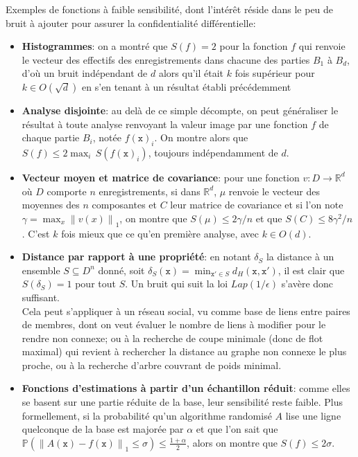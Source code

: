 \documentclass[a4paper,11pt]{article} %
\begin{document}
Exemples de fonctions à faible sensibilité, dont l'intérêt réside dans le peu de bruit à ajouter pour assurer la confidentialité différentielle:
\begin{itemize}
    \item 
    \textbf{Histogrammes}: on a montré que $S(f)=2$ pour la fonction $f$ qui renvoie le vecteur des effectifs des enregistrements dans chacune des parties $B_1$ à $B_d$, d'où un bruit indépendant de $d$ alors qu'il était $k$ fois supérieur pour $k\in O(\sqrt{d})$ en s'en tenant à un résultat établi précédemment~\cite{BDMK05} %
    \item 
    \textbf{Analyse disjointe}: au delà de ce simple décompte, on peut généraliser le résultat à toute analyse renvoyant la valeur image par une fonction $f$ de chaque partie $B_i$, notée $f(\mathtt{x})_i$. 
    On montre alors que $S(f)\leqslant2\max_i\,S\left(f(\mathtt{x})_i\right)$, toujours indépendamment de $d$.
    \item 
    \textbf{Vecteur moyen et matrice de covariance}: pour une fonction $v:D\longrightarrow\mathbb{R}^d$ où $D$ comporte $n$ enregistrements, si dans $\mathbb{R}^d$,  $\mu$ renvoie le vecteur des moyennes des $n$ composantes et $C$ leur matrice de covariance et si l'on note $\gamma=\max_x\left\|v(x)\right\|_1$, on montre que $S(\mu)\leqslant2\gamma/n$ et que $S(C)\leqslant 8\gamma^2/n$.
    C'est $k$ fois mieux que ce qu'en première analyse, avec $k\in O(d)$.
    \item 
    \textbf{Distance par rapport à une propriété}: en notant $\delta_S$ la distance à un ensemble $S\subseteq D^n$ donné, soit $\delta_S(\mathtt{x})=\min_{\mathtt{x'}\in S}d_H(\mathtt{x},\mathtt{x'})$, il est clair que $S(\delta_S)=1$ pour tout $S$. Un bruit qui suit la loi $Lap(1/\epsilon)$ s'avère donc suffisant.\\
    Cela peut s'appliquer à un réseau social, vu comme base de liens entre paires de membres, dont on veut évaluer le nombre de liens à modifier pour le rendre non connexe; ou à la recherche de coupe minimale (donc de flot maximal) qui revient à rechercher la distance au graphe non connexe le plus proche, ou à la recherche d'arbre couvrant de poids minimal.
    \item 
    \textbf{Fonctions d'estimations à partir d'un échantillon réduit}: comme elles se basent sur une partie réduite de la base, leur sensibilité reste faible. Plus formellement, si la probabilité qu'un algorithme randomisé $A$ lise une ligne quelconque de la base est majorée par $\alpha$ et que l'on sait que $\mathbb{P}\left( \left\|A(\mathtt{x})-f(\mathtt{x})\right\|_1 \leqslant \sigma \right) \leqslant \frac{1+\alpha}{2}$, alors on montre que $S(f)\leqslant2\sigma$.
\end{itemize}
%
\end{document}
